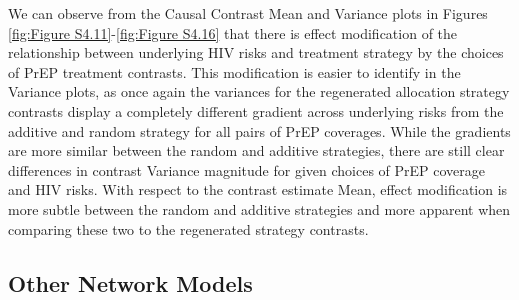 \documentclass{article}
\theoremstyle{definition}
\begin{document}
We can observe from the Causal Contrast Mean and Variance plots in Figures \ref{fig:Figure S4.11}-\ref{fig:Figure S4.16} that there is effect modification of the relationship between underlying HIV risks and treatment strategy by the choices of PrEP treatment contrasts. This modification is easier to identify in the Variance plots, as once again the variances for the regenerated allocation strategy contrasts display a completely different gradient across underlying risks from the additive and random strategy for all pairs of PrEP coverages. While the gradients are more similar between the random and additive strategies, there are still clear differences in contrast Variance magnitude for given choices of PrEP coverage and HIV risks. With respect to the contrast estimate Mean, effect modification is more subtle between the random and additive strategies and more apparent when comparing these two to the regenerated strategy contrasts. 
\subsection{Other Network Models}
\end{document}
